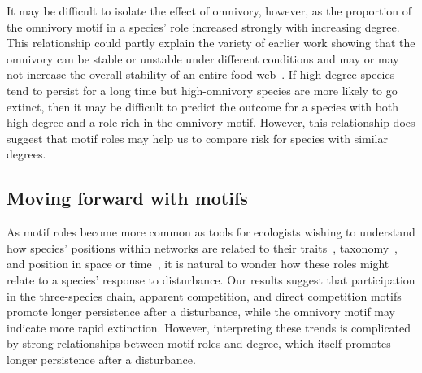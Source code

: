 \documentclass[12pt]{article}
\begin{document}
        It may be difficult to isolate the effect of omnivory, however, as the proportion of the omnivory motif in a species' role increased strongly with increasing degree. 
        This relationship could partly explain the variety of earlier work showing that the omnivory can be stable or unstable under different conditions and may or may not increase the overall stability of an entire food web~\citep{McCann1997,Emmerson2004,Borrelli2015a,Monteiro2016}.
        If high-degree species tend to persist for a long time but high-omnivory species are more likely to go extinct, then it may be difficult to predict the outcome for a species with both high degree and a role rich in the omnivory motif.
        However, this relationship does suggest that motif roles may help us to compare risk for species with similar degrees.


	\subsection*{Moving forward with motifs}	

        As motif roles become more common as tools for ecologists wishing to understand how species' positions within networks are related to their traits~\citep{Cirtwill2018EcolLett}, taxonomy~\citep{Stouffer2007}, and position in space or time~\citep{Baker2015}, it is natural to wonder how these roles might relate to a species' response to disturbance. 
        Our results suggest that participation in the three-species chain, apparent competition, and direct competition motifs promote longer persistence after a disturbance, while the omnivory motif may indicate more rapid extinction.
        However, interpreting these trends is complicated by strong relationships between motif roles and degree, which itself promotes longer persistence after a disturbance.
        
\end{document}
